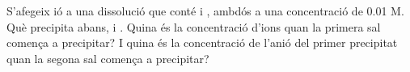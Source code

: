 \begin{exr}
S'afegeix ió  a una dissolució que conté  i , ambdós a una concentració de 0.01 M. Què precipita abans,  i . Quina és la concentració d'ions  quan la primera sal comença a precipitar? I quina és la concentració de l'anió del primer precipitat quan la segona sal comença a precipitar?
\end{exr}